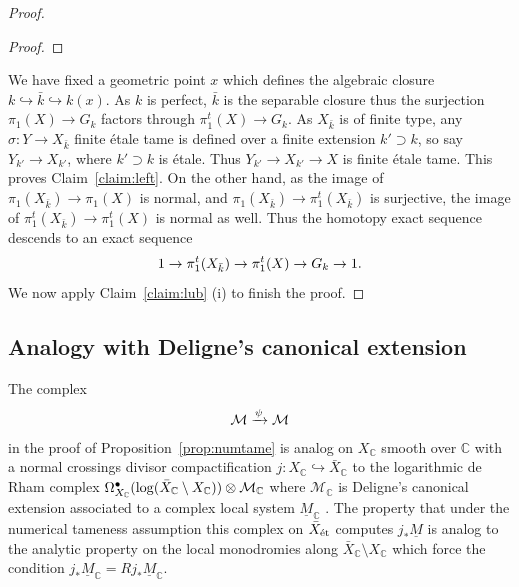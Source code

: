 \documentclass[12pt]{amsart}
\theoremstyle{plain}
\theoremstyle{definition}
\numberwithin{thm}{section}
\newcommand{\ga}[2]{\begin{gather}\label{#1}#2 \end{gather}}
\newcommand{\sM}{{\mathcal M}}
\newcommand{\C}{{\mathbb C}}
\numberwithin{equation}{section}
\begin{document}
\begin{proof}
\begin{proof}
\end{proof}
We have fixed a geometric point $x$ which defines the algebraic closure $k\hookrightarrow \bar k\hookrightarrow k(x)$.  As $k$ is perfect, $\bar k$ is the separable closure thus the surjection 
$\pi_1(X)\to G_k$ factors through $\pi_1^t(X)\to G_k$. 
As $X_{\bar k}$ is of finite type, any $\sigma: Y\to X_{\bar k}$  finite \'etale  tame  is defined over a finite extension $k'\supset k$, so say $Y_{k'}\to X_{k'}$, where $k'\supset k$ is \'etale. Thus 
$Y_{k'}\to X_{k'}\to X$ is finite \'etale tame.  This proves Claim~\ref{claim:left}. 
On the other hand, as the image of $\pi_1(X_{\bar k})\to \pi_1(X)$ is normal, and $\pi_1(X_{\bar k})\to \pi^t_1(X_{\bar k})$ is surjective, the image of $\pi^t_1(X_{\bar k})\to \pi^t_1(X)$ is normal as well. 
 Thus the homotopy exact sequence descends to an exact sequence 
\ga{}{1\to \pi^t_1(X_{\bar k})\to \pi^t_1(X)\to G_k\to 1.\notag}
We now apply Claim~\ref{claim:lub}  (i) to finish the proof. 


\end{proof}

\subsection{Analogy with Deligne's canonical extension}
The complex 
\ga{}{\sM \xrightarrow{\psi} \sM \notag}
in the proof of Proposition~\ref{prop:numtame} is analog  on $X_\C$ smooth over $\C$ with a normal crossings divisor compactification $j: X_\C\hookrightarrow \bar X_{\C}$ to the logarithmic de Rham complex $\Omega_{X_\C} ^\bullet({\rm log}( \bar X_\C\setminus X_\C)) \otimes \sM_\C$ where $\sM_\C$ is Deligne's canonical extension associated to a  complex local system $\underline{M}_\C$ \cite[Proposition~.5.2, p.~91]{Del70}.
The property that under the numerical tameness assumption  this complex on $\bar X_{\rm \acute{e}t}$ computes $j_*\underline{M}$ is analog to the  analytic property  on the local monodromies along $ \bar X_\C\setminus X_\C$ which force the condition
 $j_*\underline{M}_\C=Rj_*\underline{M}_\C$.
\end{document}
